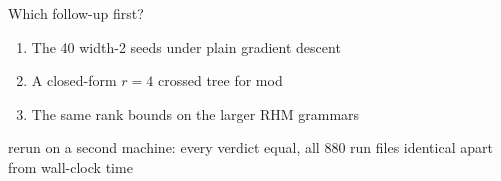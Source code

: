 \documentclass[aspectratio=169,12pt,t]{beamer}
\newcommand{\contextline}[1]{{\par\centering\small\color{secondary}#1\par}}
\newcommand{\modg}{\textsf{mod}}
\begin{document}
\begin{frame}{Which follow-up first?}
  \vspace{8mm}
  \begin{enumerate}
    \setlength{\itemsep}{7mm}
    \item The 40 width-2 seeds under plain gradient descent
    \item A closed-form $r=4$ crossed tree for \modg
    \item The same rank bounds on the larger RHM grammars
  \end{enumerate}
  \vspace{9mm}
  \contextline{rerun on a second machine: every verdict equal, all 880 run files identical apart from wall-clock time}
\end{frame}
\end{document}
